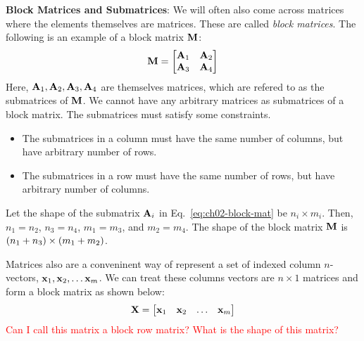\noindent\textbf{Block Matrices and Submatrices}: We will often also come across matrices where the elements themselves are matrices. These are called \textit{block matrices}. The following is an example of a block matrix $\mathbf{M}$:
\begin{equation}
    \mf{M} = \bmxc \mf{A}_1 & \mf{A}_2 \\ \mf{A}_3 & \mf{A}_4 \emx
    \label{eq:ch02-block-mat}
\end{equation}
Here, $\mathbf{A}_1, \mathbf{A}_2, \mathbf{A}_3, \mathbf{A}_4$ are themselves matrices, which are refered to as the submatrices of $\mathbf{M}$. We cannot have any arbitrary matrices as submatrices of a block matrix. The submatrices must satisfy some constraints.
\begin{itemize}
    \item The submatrices in a column must have the same number of columns, but have arbitrary number of rows.
    \item The submatrices in a row must have the same number of rows, but have arbitrary number of columns.
\end{itemize}
Let the shape of the submatrix $\mathbf{A}_i$ in Eq.~\ref{eq:ch02-block-mat} be $n_i \times m_i$. Then, $n_1 = n_2$, $n_3 = n_4$, $m_1 = m_3$, and $m_2 = m_4$. The shape of the block matrix $\mathbf{M}$ is $\left( n_1 + n_3\right) \times \left( m_1 + m_2\right)$.

Matrices also are a conveninent way of represent a set of indexed column $n$-vectors, $\mathbf{x}_1, \mathbf{x}_2, \ldots \mathbf{x}_m$. We can treat these columns vectors are $n \times 1$ matrices and form a block matrix as shown below:
\begin{equation}
    \mf{X} = \bmxc \mf{x}_1 & \mf{x}_2 & \ldots & \mf{x}_m \emx
    \label{eq:ch02-block-col-vec}
\end{equation}
\textcolor{red}{Can I call this matrix a block row matrix? What is the shape of this matrix?}
